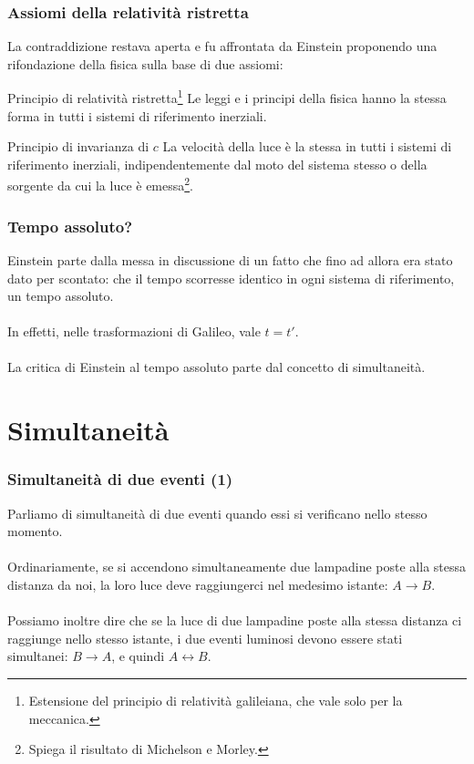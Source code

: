 \documentclass[]{beamer}
\theoremstyle{plain}
\begin{document}
\begin{frame}
\frametitle{Assiomi della relatività ristretta}
La contraddizione restava aperta e fu affrontata da Einstein proponendo una rifondazione della fisica sulla base di \alert<1>{due assiomi}:\pause
\begin{block}{Principio di relatività ristretta\footnote{Estensione del principio di relatività galileiana, che vale solo per la meccanica.}}
  Le leggi e i principi della fisica hanno la stessa forma in tutti i sistemi di riferimento inerziali.
\end{block}\pause
\begin{block}{Principio di invarianza di $ c $}
La velocità della luce è la stessa in tutti i sistemi di riferimento inerziali, indipendentemente dal moto del sistema stesso o della sorgente da cui la luce è emessa\footnote{Spiega il risultato di Michelson e Morley.}.
\end{block}
\end{frame}



\begin{frame}
  \frametitle{Tempo assoluto?}
  Einstein parte dalla messa in discussione di un fatto che fino ad allora era stato dato per scontato: che il tempo scorresse \alert<1>{identico in ogni sistema di riferimento}, un tempo assoluto.\\~\pause\\In effetti, nelle trasformazioni di Galileo, vale $ t = t' $.\\~\pause\\  
  La critica di Einstein al tempo assoluto parte dal concetto di \alert<3>{simultaneità}.
\end{frame}







\section{Simultaneità}

\begin{frame}
\frametitle{Simultaneità di due eventi (1)}
Parliamo di simultaneità di due eventi quando essi si verificano nello stesso momento.\\~\pause\\

Ordinariamente, se si accendono simultaneamente due lampadine poste alla stessa distanza da noi, la loro luce deve raggiungerci nel medesimo istante: \alert<2-3>{$ A \rightarrow B $}.\\~\pause\\
Possiamo inoltre dire che se la luce di due lampadine poste alla stessa distanza ci raggiunge nello stesso istante, i due eventi luminosi devono essere stati simultanei: \alert<3>{$ B \rightarrow A $}, e quindi \alert<3>{$ A \leftrightarrow B $}.
\end{frame}
\end{document}
